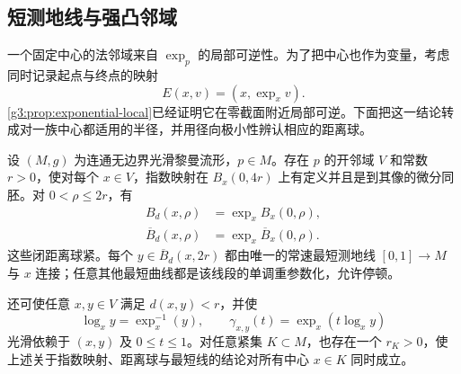 \subsection{短测地线与强凸邻域}
\label{g3:subsec:0202:02}

一个固定中心的法邻域来自 \(\exp_p\) 的局部可逆性。为了把中心也作为变量，考虑同时记录起点与终点的映射
\[
	E(x,v)=(x,\exp_xv).
\]
\cref{g3:prop:exponential-local}已经证明它在零截面附近局部可逆。下面把这一结论转成对一族中心都适用的半径，并用径向极小性辨认相应的距离球。

\begin{lemma}
	\label{g3:lem:uniform-normal-neighborhood}
	设 \((M,g)\) 为连通无边界光滑黎曼流形，\(p\in M\)。存在 \(p\) 的开邻域 \(V\) 和常数 \(r>0\)，使对每个 \(x\in V\)，指数映射在 \(B_x(0,4r)\) 上有定义并且是到其像的微分同胚。对 \(0<\rho\leq2r\)，有
	\begin{equation}
		\label{g3:eq:uniform-normal-balls}
		\begin{aligned}
			B_d(x,\rho)&=\exp_x B_x(0,\rho),\\
			\overline B_d(x,\rho)&=\exp_x\overline B_x(0,\rho).
		\end{aligned}
	\end{equation}
	这些闭距离球紧。每个 \(y\in\overline B_d(x,2r)\) 都由唯一的常速最短测地线 \([0,1]\to M\) 与 \(x\) 连接；任意其他最短曲线都是该线段的单调重参数化，允许停顿。

	还可使任意 \(x,y\in V\) 满足 \(d(x,y)<r\)，并使
	\[
		\log_x y=\exp_x^{-1}(y),\qquad
		\gamma_{x,y}(t)=\exp_x(t\log_xy)
	\]
	光滑依赖于 \((x,y)\) 及 \(0\leq t\leq1\)。对任意紧集 \(K\subset M\)，也存在一个 \(r_K>0\)，使上述关于指数映射、距离球与最短线的结论对所有中心 \(x\in K\) 同时成立。
\end{lemma}
